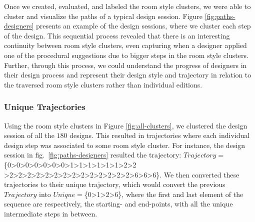 Once we created, evaluated, and labeled the room style clusters, we were able to cluster and visualize the paths of a typical design session. Figure \ref{fig:paths-designers} presents an example of the design sessions, where we cluster each step of the design. This sequential process revealed that there is an interesting continuity between room style clusters, even capturing when a designer applied one of the procedural suggestions due to bigger steps in the room style clusters. Further, through this process, we could understand the progress of designers in their design process and represent their design style and trajectory in relation to the traversed room style clusters rather than individual editions. 


\subsubsection{Unique Trajectories}

Using the room style clusters in Figure \ref{fig:all-clusters}, we clustered the design session of all the $180$ designs. This resulted in trajectories where each individual design step was associated to some room style cluster. For instance, the design session in fig.~\ref{fig:paths-designers} resulted the trajectory: $Trajectory=$\{0\textgreater0\textgreater0\textgreater0\textgreater0\textgreater0\textgreater0\textgreater1\textgreater1\textgreater1\textgreater1\textgreater1\textgreater1\textgreater2\textgreater2 \textgreater2\textgreater2\textgreater2\textgreater2\textgreater2\textgreater2\textgreater2\textgreater2\textgreater2\textgreater2\textgreater2\textgreater2\textgreater2\textgreater2\textgreater6\textgreater6\textgreater6\}. We then converted these trajectories to their unique trajectory, which would convert the previous $Trajectory$ into $Unique=$\{0\textgreater1\textgreater2\textgreater6\}, where the first and last element of the sequence are respectively, the starting- and end-points, with all the unique intermediate steps in between.



